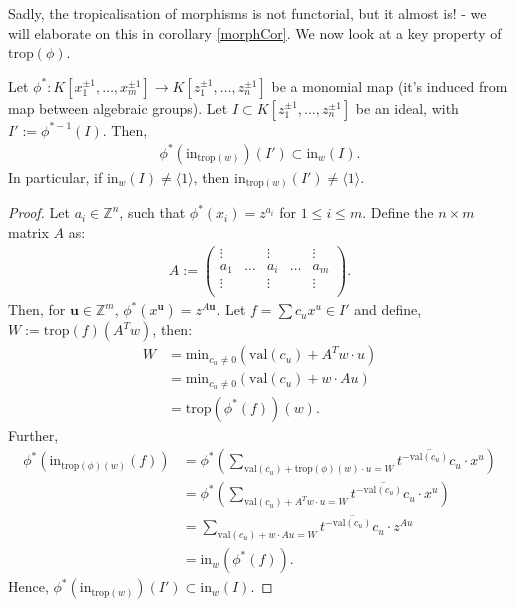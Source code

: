 Sadly, the tropicalisation of morphisms is not functorial, but it almost is! - we will elaborate on this in corollary \ref{morphCor}.
    We now look at a key property of $\text{trop}(\phi)$.
    \begin{lemma}
        \label{tropMorLem}
        Let $\phi^{*}:  K[x_{1}^{\pm1}, \dots, x_{m}^{\pm1}] \to  K[z_{1}^{\pm1}, \dots, z_{n}^{\pm1}]$ be a monomial map (it's induced from map between algebraic groups).
        Let $I \subset  K[z_{1}^{\pm1}, \dots, z_{n}^{\pm1}]$ be an ideal, with $I':= \phi^{*-1}(I)$.
        Then,
        \begin{align*}
            \phi^{*}(\text{in}_{\text{trop}(w)})(I') \subset \text{in}_{w}(I).
        \end{align*}    
        In particular, if $\text{in}_{w}(I) \neq \langle 1 \rangle$, then $\text{in}_{\text{trop}(w)}(I') \neq \langle 1 \rangle$.
    \end{lemma}
    \begin{proof}
        Let $a_{i} \in \mathbb{Z}^{n}$, such that $\phi^{*}(x_{i}) = z^{a_{i}}$ for $1\leq i \leq m$.
        Define the $n \times m$ matrix $A$ as:
        \begin{align*} A:=
            \begin{pmatrix}
                \vdots & & \vdots& & \vdots \\
                a_{1} & \hdots & a_{i}& \hdots & a_{m}\\
                \vdots & & \vdots& & \vdots \\
            \end{pmatrix}.
        \end{align*}
        Then, for $\textbf{u} \in \mathbb{Z}^{m}$, $\phi^{*}(x^{\textbf{u}}) = z^{A \textbf{u}}$.
        Let $f = \sum c_{u}x^{u} \in I'$ and define, $W:= \text{trop}(f)(A^{T}w)$, then:
        \begin{align*}
            W &= \text{min}_{c_{u}\neq 0 }(\text{val}(c_{u}) + A^{T}w \cdot u) \\
              &= \text{min}_{c_{u}\neq 0 }(\text{val}(c_{u}) + w \cdot Au) \\
              &= \text{trop}(\phi^{*}(f))(w).
        \end{align*}
        Further, 
        \begin{align*}
            \phi^{*}(\text{in}_{\text{trop}(\phi)(w)}(f)) &= \phi^{*}\left( \sum_{\text{val}(c_{u}) + \text{trop}(\phi)(w) \cdot u = W} \overline{t^{-\text{val}(c_{u})}c_{u}}\cdot x^{u}\right)\\
                                                          &= \phi^{*}\left( \sum_{\text{val}(c_{u}) + A^{T}w \cdot u = W} \overline{t^{-\text{val}(c_{u})}c_{u}}\cdot x^{u}\right)\\
                                                          &= \sum_{\text{val}(c_{u}) + w \cdot Au = W} \overline{t^{-\text{val}(c_{u})}c_{u}} \cdot z^{Au}\\
                                                          &= \text{in}_{w}(\phi^{*}(f)).
        \end{align*}
        Hence, $\phi^{*}(\text{in}_{\text{trop}(w)})(I') \subset \text{in}_{w}(I)$.
    \end{proof}

